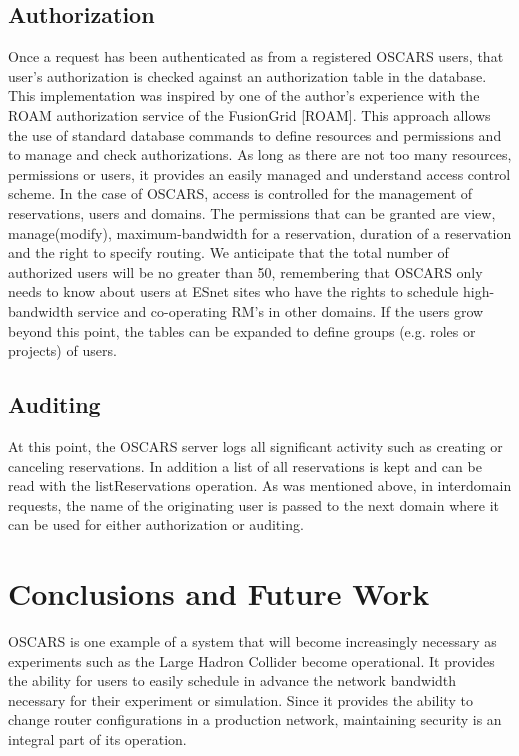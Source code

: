 \documentclass[conference]{IEEEtran}
\begin{document}
\subsection{Authorization}
Once a request has been authenticated as from a registered OSCARS
users, that user's authorization is checked against an authorization
table in the database. This implementation was inspired by one of the
author's experience with the ROAM authorization service of the
FusionGrid [ROAM]. This approach allows the use of standard database
commands to define resources and permissions and to manage and check
authorizations. As long as there are not too many resources,
permissions or users, it provides an easily managed and understand
access control scheme. In the case of OSCARS,  access  is controlled for 
the management of reservations, users and domains. The permissions that can
be granted are view, manage(modify), maximum-bandwidth for a
reservation, duration of a reservation and the right to specify
routing.  We anticipate that the total number of authorized users will
be no greater than 50, remembering that OSCARS only needs to know
about users at ESnet sites who have the rights to schedule
high-bandwidth service and co-operating RM's in other
domains. If the users grow beyond this point, the tables can be
expanded to define groups (e.g. roles or projects) of users.

\subsection{Auditing}
At this point, the OSCARS server logs all significant activity such as
creating or canceling reservations. In addition a list of all
reservations is kept and can be read with the listReservations
operation. As was mentioned above, in interdomain requests, the name
of the originating user is passed to the next domain where it can be
used for either authorization or auditing.


\section{Conclusions and Future Work}

OSCARS is one example of a system that will become increasingly necessary
as experiments such as the Large Hadron Collider become operational.  It
provides the ability for users to easily schedule in advance the 
network bandwidth necessary for their experiment or simulation.  Since it
provides the ability to change router configurations in a production network,
maintaining security is an integral part of its operation.
\end{document}
